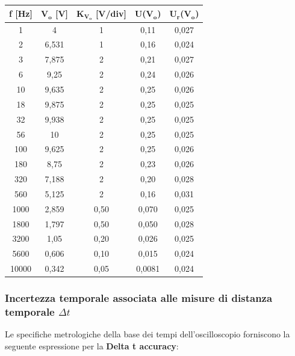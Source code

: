 \begin{table}[!ht]
    \centering
    \begin{tabular}{|c|c|c|c|c|}
    \hline

        \textbf{f [Hz]} & \textbf{$\bm{V_{o}}$ [V]} & \textbf{$\bm{K_{V_o}}$ [V/div]} & \textbf{U($\bm{V_{o}}$)} & \textbf{$\bm{U_r}$($\bm{V_{o}}$)} \\ \hline

        1 & 4 & 1 & 0,11 & 0,027 \\ \hline
        2 & 6,531 & 1 & 0,16 & 0,024 \\ \hline
        3 & 7,875 & 2 & 0,21 & 0,027 \\ \hline
        6 & 9,25 & 2 & 0,24 & 0,026 \\ \hline
        10 & 9,635 & 2 & 0,25 & 0,026 \\ \hline
        18 & 9,875 & 2 & 0,25 & 0,025 \\ \hline
        32 & 9,938 & 2 & 0,25 & 0,025 \\ \hline
        56 & 10 & 2 & 0,25 & 0,025 \\ \hline
        100 & 9,625 & 2 & 0,25 & 0,026 \\ \hline
        180 & 8,75 & 2 & 0,23 & 0,026 \\ \hline
        320 & 7,188 & 2 & 0,20 & 0,028 \\ \hline
        560 & 5,125 & 2 & 0,16 & 0,031 \\ \hline
        1000 & 2,859 & 0,50 & 0,070 & 0,025 \\ \hline
        1800 & 1,797 & 0,50 & 0,050 & 0,028 \\ \hline
        3200 & 1,05 & 0,20 & 0,026 & 0,025 \\ \hline
        5600 & 0,606 & 0,10 & 0,015 & 0,024 \\ \hline
        10000 & 0,342 & 0,05 & 0,0081 & 0,024 \\ \hline
    \end{tabular}
\end{table}

\FloatBarrier
\clearpage


\subsubsection*{Incertezza temporale associata alle misure di distanza temporale $\Delta t$}

Le specifiche metrologiche della base dei tempi dell'oscilloscopio forniscono la seguente espressione per la \textbf{Delta t accuracy}:

